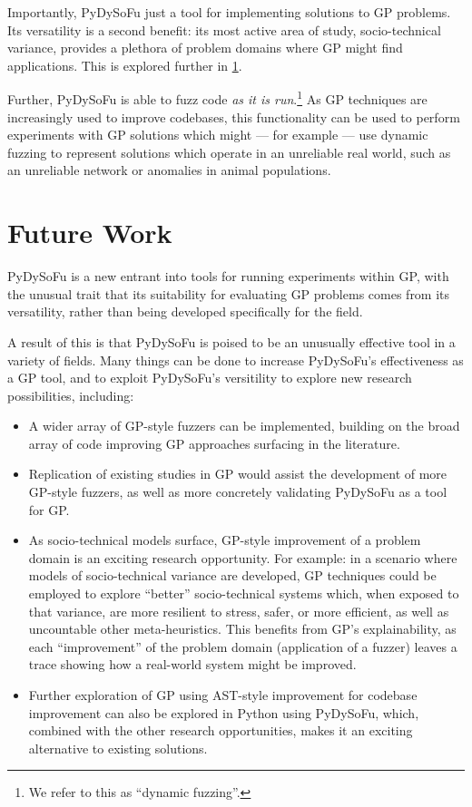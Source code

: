 \documentclass[draft,12pt]{llncs}   %
\begin{document}
Importantly, PyDySoFu just a tool for implementing solutions to GP problems. Its
versatility is a second benefit: its most active area of study, socio-technical
variance, provides a plethora of problem domains where GP might find
applications. This is explored further in \cref{sec:future_work}.\par

Further, PyDySoFu is able to fuzz code \emph{as it is run}.\footnote{We refer to
this as ``dynamic fuzzing''.} As GP
techniques are increasingly used to improve codebases, this functionality can be
used to perform experiments with GP solutions which might --- for example ---
use dynamic fuzzing to represent solutions which operate in an unreliable real
world, such as an unreliable network or anomalies in animal populations.\par

\section{Future Work}
\label{sec:future_work}

PyDySoFu is a new entrant into tools for running experiments within GP, with the
unusual trait that its suitability for evaluating GP problems comes from its
versatility, rather than being developed specifically for the field.\par

A result of this is that PyDySoFu is poised to be an unusually effective tool in
a variety of fields. Many things can be done to increase PyDySoFu's
effectiveness as a GP tool, and to exploit PyDySoFu's versitility to explore new
research possibilities, including:

\begin{itemize}
\item A wider array of GP-style fuzzers can be implemented, building on the
  broad array of code improving GP approaches surfacing in the literature.

\item Replication of existing studies in GP would assist the development of more
GP-style fuzzers, as well as more concretely validating PyDySoFu as a tool for
GP.
  
\item As socio-technical models surface, GP-style improvement of a problem
  domain is an exciting research opportunity. For example: in a scenario where
  models of socio-technical variance are developed, GP techniques could be
  employed to explore ``better'' socio-technical systems which, when exposed to
  that variance, are more resilient to stress, safer, or more efficient, as well
  as uncountable other meta-heuristics. This benefits from GP's explainability,
  as each ``improvement'' of the problem domain (application of a fuzzer) leaves
  a trace showing how a real-world system might be improved.

\item Further exploration of GP using AST-style improvement for codebase
  improvement can also be explored in Python using PyDySoFu, which, combined
  with the other research opportunities, makes it an exciting alternative to
  existing solutions.
\end{itemize}
\end{document}
